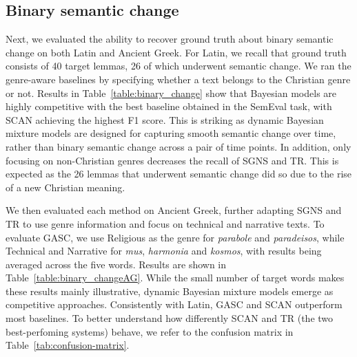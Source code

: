 \documentclass[output=paper]{langscibook}
\begin{document}
\subsection{Binary semantic change}
\label{binary-eval}
Next, we evaluated the ability to recover ground truth about binary semantic change on both Latin and Ancient Greek. For Latin, we recall that ground truth consists of 40 target lemmas, 26 of which underwent semantic change. We ran the genre-aware baselines by specifying whether a text belongs to the Christian genre or not. Results in Table~\ref{table:binary_change} show that Bayesian models are highly competitive with the best baseline obtained in the SemEval task, with SCAN achieving the highest F1 score. This is striking as dynamic Bayesian mixture models are designed for capturing smooth semantic change over time, rather than binary semantic change across a pair of time points. In addition, only focusing on non-Christian genres decreases the recall of SGNS and TR. This is expected as the 26 lemmas that underwent semantic change did so due to the rise of a new Christian meaning. 

We then evaluated each method on Ancient Greek, further adapting SGNS and TR to use genre information and focus on technical and narrative texts. To evaluate GASC, we use Religious as the genre for \emph{parabole} and \emph{paradeisos}, while Technical and Narrative for \emph{mus}, \emph{harmonia} and \emph{kosmos}, with results being averaged across the five words. Results are shown in Table~\ref{table:binary_changeAG}. While the small number of target words makes these results mainly illustrative, dynamic Bayesian mixture models emerge as competitive approaches. Consistently with Latin, GASC and SCAN outperform most baselines.
To better understand how differently SCAN and TR (the two best-perfoming systems) behave, we refer to the confusion matrix in Table~\ref{tab:confusion-matrix}.
\end{document}
